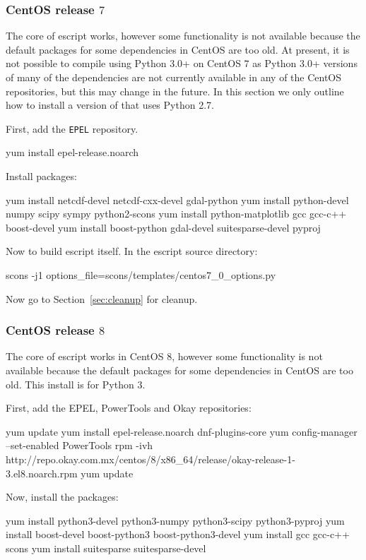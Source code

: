\subsubsection{CentOS release $7$}
The core of escript works, however some functionality is not available because the default packages for some dependencies in CentOS are too old.
At present, it is not possible to compile \escript using Python 3.0+ on CentOS $7$ as Python 3.0+ versions of many of the dependencies are not currently available in any of the CentOS repositories, but this may change in the future. 
In this section we only outline how to install a version of \escript that uses Python 2.7.

\noindent First, add the \texttt{EPEL} repository.
\begin{shellCode}
yum install epel-release.noarch
\end{shellCode}

\noindent Install packages:
\begin{shellCode}
yum install netcdf-devel netcdf-cxx-devel gdal-python
yum install python-devel numpy scipy sympy python2-scons
yum install python-matplotlib gcc gcc-c++ boost-devel
yum install boost-python gdal-devel suitesparse-devel pyproj
\end{shellCode}

\noindent Now to build escript itself.
In the escript source directory:
\begin{shellCode}
scons -j1 options_file=scons/templates/centos7_0_options.py
\end{shellCode}

\noindent Now go to Section~\ref{sec:cleanup} for cleanup.

\subsubsection{CentOS release $8$}
The core of escript works in CentOS $8$, however some functionality is not available because the default packages for some dependencies in CentOS are too old. This install is for Python 3.

First, add the EPEL, PowerTools and Okay repositories:
\begin{shellCode}
yum update
yum install epel-release.noarch dnf-plugins-core
yum config-manager --set-enabled PowerTools
rpm -ivh http://repo.okay.com.mx/centos/8/x86_64/release/okay-release-1-3.el8.noarch.rpm
yum update
\end{shellCode}

Now, install the packages:
\begin{shellCode}
yum install python3-devel python3-numpy python3-scipy python3-pyproj
yum install boost-devel boost-python3 boost-python3-devel
yum install gcc gcc-c++ scons
yum install suitesparse suitesparse-devel 
\end{shellCode}

